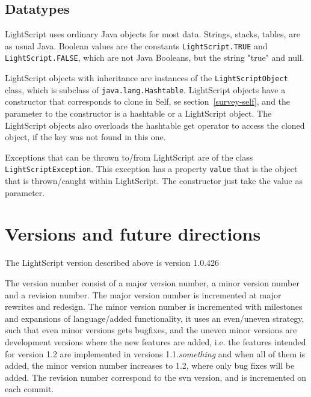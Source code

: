 \documentclass[11pt]{report}
\begin{document}
\subsection{Datatypes}
LightScript uses ordinary Java objects for most data.
Strings, stacks, tables, are as usual Java.
Boolean values are the constants \verb|LightScript.TRUE| and \verb|LightScript.FALSE|, which are not Java Booleans, but the string "true" and null.

LightScript objects with inheritance are instances of the \verb|LightScriptObject| class, which is subclass of \verb|java.lang.Hashtable|. LightScript objects have a constructor that corresponds to clone in Self, se section~\ref{survey-self}, and the parameter to the constructor is a hashtable or a LightScript object. The LightScript objects also overloads the hashtable get operator to access the cloned object, if the key was not found in this one.

Exceptions that can be thrown to/from LightScript are of the class \verb|LightScriptException|. This exception has a property \verb|value| that is the object that is thrown/caught within LightScript. The constructor just take the value as parameter.

\section{Versions and future directions}
The LightScript version described above is version 1.0.426

The version number consist of a major version number, a minor version number and a revision number.
The major version number is incremented at major rewrites and redesign.
The minor version number is incremented with milestones and expansions of language/added functionality, it uses an even/uneven strategy, such that even minor versions gets bugfixes, and the uneven minor versions are development versions where the new features are added, i.e. 
the features intended for version 1.2 are implemented in versions 1.1.\emph{something} and when all of them is added, the minor version number increases to 1.2, where only bug fixes will be added.
The revision number correspond to the svn version, and is incremented on each commit.
\end{document}
